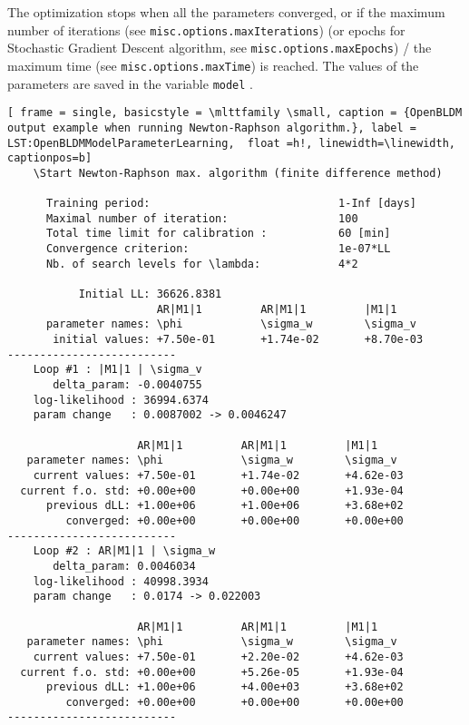 The optimization stops when all the parameters converged, or if the maximum number of iterations (see \lstinline[basicstyle = \mlttfamily \small ]!misc.options.maxIterations!) (or epochs for Stochastic Gradient Descent algorithm, see \lstinline[basicstyle = \mlttfamily \small ]!misc.options.maxEpochs!) / the maximum time (see \lstinline[basicstyle = \mlttfamily \small ]!misc.options.maxTime!) is reached.
The values of the parameters are saved in the variable \lstinline[basicstyle = \mlttfamily \small ]!model! \MATLAB{}.
 
 \begin{lstlisting}[ frame = single, basicstyle = \mlttfamily \small, caption = {OpenBLDM output example when running Newton-Raphson algorithm.}, label = LST:OpenBLDMModelParameterLearning,  float =h!, linewidth=\linewidth, captionpos=b]
    \Start Newton-Raphson max. algorithm (finite difference method)

      Training period:                             1-Inf [days]
      Maximal number of iteration:                 100
      Total time limit for calibration :           60 [min]
      Convergence criterion:                       1e-07*LL
      Nb. of search levels for \lambda:            4*2

           Initial LL: 36626.8381
                       AR|M1|1         AR|M1|1         |M1|1            
      parameter names: \phi            \sigma_w        \sigma_v         
       initial values: +7.50e-01       +1.74e-02       +8.70e-03       
--------------------------
    Loop #1 : |M1|1 | \sigma_v 
       delta_param: -0.0040755 
    log-likelihood : 36994.6374
    param change   : 0.0087002 -> 0.0046247

                    AR|M1|1         AR|M1|1         |M1|1           
   parameter names: \phi            \sigma_w        \sigma_v        
    current values: +7.50e-01       +1.74e-02       +4.62e-03      
  current f.o. std: +0.00e+00       +0.00e+00       +1.93e-04      
      previous dLL: +1.00e+06       +1.00e+06       +3.68e+02      
         converged: +0.00e+00       +0.00e+00       +0.00e+00      
--------------------------
    Loop #2 : AR|M1|1 | \sigma_w 
       delta_param: 0.0046034 
    log-likelihood : 40998.3934
    param change   : 0.0174 -> 0.022003

                    AR|M1|1         AR|M1|1         |M1|1           
   parameter names: \phi            \sigma_w        \sigma_v        
    current values: +7.50e-01       +2.20e-02       +4.62e-03      
  current f.o. std: +0.00e+00       +5.26e-05       +1.93e-04      
      previous dLL: +1.00e+06       +4.00e+03       +3.68e+02      
         converged: +0.00e+00       +0.00e+00       +0.00e+00      
--------------------------
\end{lstlisting}



